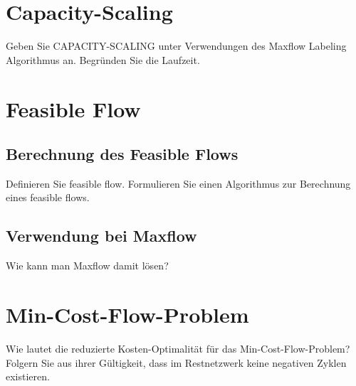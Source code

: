 \section{Capacity-Scaling}
\label{sec-4}
Geben Sie CAPACITY-SCALING unter Verwendungen des Maxflow Labeling Algorithmus an. Begründen Sie die Laufzeit.









\section{Feasible Flow}
\label{sec-5}

\subsection{Berechnung des Feasible Flows}
Definieren Sie feasible flow. Formulieren Sie einen Algorithmus zur Berechnung eines feasible flows.


\subsection{Verwendung bei Maxflow}
 Wie kann man Maxflow damit lösen?




\section{Min-Cost-Flow-Problem}
Wie lautet die reduzierte Kosten-Optimalität für das Min-Cost-Flow-Problem? Folgern Sie aus ihrer Gültigkeit, dass im Restnetzwerk keine negativen Zyklen existieren.

















